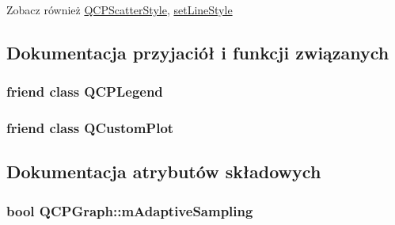 \begin{DoxySeeAlso}{Zobacz również}
\hyperlink{class_q_c_p_scatter_style}{Q\+C\+P\+Scatter\+Style}, \hyperlink{class_q_c_p_graph_a513fecccff5b2a50ce53f665338c60ff}{set\+Line\+Style} 
\end{DoxySeeAlso}


\subsection{Dokumentacja przyjaciół i funkcji związanych}
\subsubsection[{\texorpdfstring{Q\+C\+P\+Legend}{QCPLegend}}]{\setlength{\rightskip}{0pt plus 5cm}friend class {\bf Q\+C\+P\+Legend}\hspace{0.3cm}{\ttfamily [friend]}}\hypertarget{class_q_c_p_graph_a8429035e7adfbd7f05805a6530ad5e3b}{}\label{class_q_c_p_graph_a8429035e7adfbd7f05805a6530ad5e3b}
\subsubsection[{\texorpdfstring{Q\+Custom\+Plot}{QCustomPlot}}]{\setlength{\rightskip}{0pt plus 5cm}friend class {\bf Q\+Custom\+Plot}\hspace{0.3cm}{\ttfamily [friend]}}\hypertarget{class_q_c_p_graph_a1cdf9df76adcfae45261690aa0ca2198}{}\label{class_q_c_p_graph_a1cdf9df76adcfae45261690aa0ca2198}


\subsection{Dokumentacja atrybutów składowych}
\subsubsection[{\texorpdfstring{m\+Adaptive\+Sampling}{mAdaptiveSampling}}]{\setlength{\rightskip}{0pt plus 5cm}bool Q\+C\+P\+Graph\+::m\+Adaptive\+Sampling\hspace{0.3cm}{\ttfamily [protected]}}\hypertarget{class_q_c_p_graph_aa951e78aeba714cf443be6da2e52502e}{}\label{class_q_c_p_graph_aa951e78aeba714cf443be6da2e52502e}
